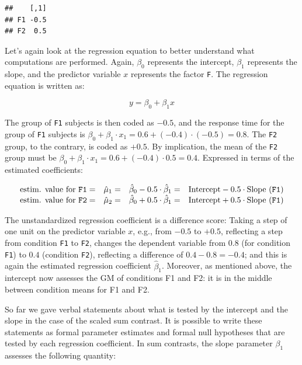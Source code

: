 \documentclass[12pt,]{krantz}
\theoremstyle{definition}
\theoremstyle{definition}
\theoremstyle{definition}
\theoremstyle{remark}
\begin{document}
\begin{verbatim}
##    [,1]
## F1 -0.5
## F2  0.5
\end{verbatim}

Let's again look at the regression equation to better understand what
computations are performed. Again, \(\beta_0\) represents the intercept,
\(\beta_1\) represents the slope, and the predictor variable \(x\)
represents the factor \texttt{F}. The regression equation is written as:

\begin{equation}
y = \beta_0 + \beta_1x
\label{eq:lm2}
\end{equation}

The group of \texttt{F1} subjects is then coded as \(-0.5\), and the
response time for the group of \texttt{F1} subjects is
\(\beta_0 + \beta_1 \cdot x_1 = 0.6 + (-0.4) \cdot (-0.5) = 0.8\). The
\texttt{F2} group, to the contrary, is coded as \(+0.5\). By
implication, the mean of the \texttt{F2} group must be
\(\beta_0 + \beta_1 \cdot x_1 = 0.6 + (-0.4) \cdot 0.5 = 0.4\).
Expressed in terms of the estimated coefficients:

\begin{equation}
\begin{array}{lccll}
\text{estim. value for \texttt{F1}} = & \hat{\mu}_1 = & \hat{\beta}_0 - 0.5 \cdot \hat{\beta}_1 = & \text{Intercept} - 0.5 \cdot \text{Slope (\texttt{F1})}\\
\text{estim. value for \texttt{F2}} = & \hat{\mu}_2 = & \hat{\beta}_0 + 0.5 \cdot \hat{\beta}_1 = & \text{Intercept} + 0.5 \cdot \text{Slope (\texttt{F1})}
\end{array}
\label{eq:predVal2}
\end{equation}

The unstandardized regression coefficient is a difference score: Taking
a step of one unit on the predictor variable \(x\), e.g., from \(-0.5\)
to \(+0.5\), reflecting a step from condition \texttt{F1} to
\texttt{F2}, changes the dependent variable from \(0.8\) (for condition
\texttt{F1}) to \(0.4\) (condition \texttt{F2}), reflecting a difference
of \(0.4 - 0.8 = -0.4\); and this is again the estimated regression
coefficient \(\hat{\beta}_1\). Moreover, as mentioned above, the
intercept now assesses the GM of conditions F1 and F2: it is in the
middle between condition means for F1 and F2.

So far we gave verbal statements about what is tested by the intercept
and the slope in the case of the scaled sum contrast. It is possible to
write these statements as formal parameter estimates and formal null
hypotheses that are tested by each regression coefficient. In sum
contrasts, the slope parameter \(\beta_1\) assesses the following
quantity:
\end{document}
